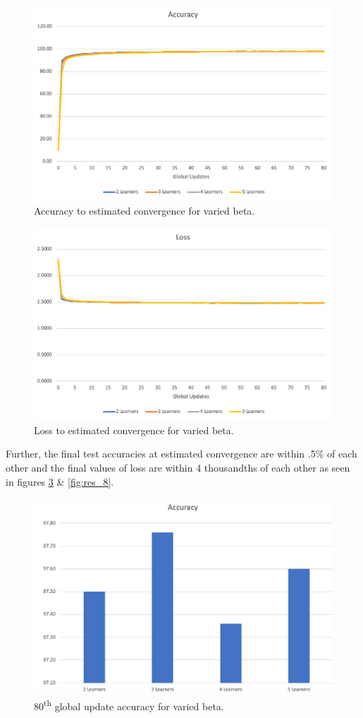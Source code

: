 \documentclass[../mthe-493-final-project.tex]{subfiles}
\begin{document}
    \begin{figure}
        \centering
        \includegraphics[width=120mm]{thesis/img/res_5.png}
        \caption{Accuracy to estimated convergence for varied beta.}
        \label{fig:res_5}
    \end{figure}
    \begin{figure}
        \centering
        \includegraphics[width=120mm]{thesis/img/res_6.png}
        \caption{Loss to estimated convergence for varied beta.}
        \label{fig:res_6}
    \end{figure}
    Further, the final test accuracies at estimated convergence are within .5\% of each other and the final values of loss are within 4 thousandths of each other as seen in figures \ref{fig:res_7} \& \ref{fig:res_8}. 
    \begin{figure}
        \centering
        \includegraphics[width=138mm]{thesis/img/res_7.png}
        \caption{80\textsuperscript{th} global update accuracy for varied beta.}
        \label{fig:res_7}
    \end{figure}
\end{document}
